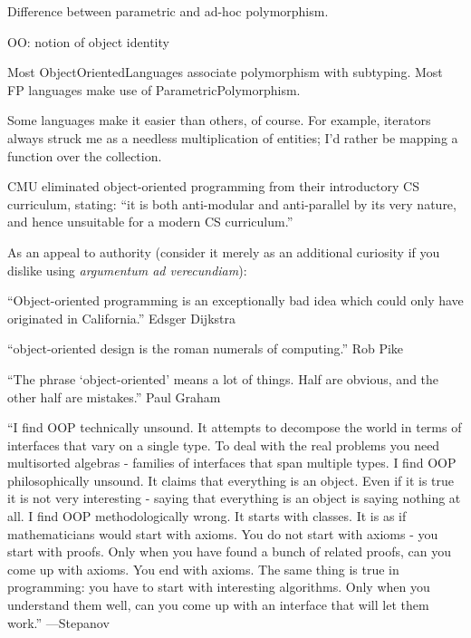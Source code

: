 \documentclass{article}
\begin{document}
Difference between parametric and ad-hoc polymorphism.

OO: notion of object identity

Most ObjectOrientedLanguages associate polymorphism with subtyping. Most FP
languages make use of ParametricPolymorphism.

Some languages make it easier than others, of course. For example, iterators
always struck me as a needless multiplication of entities; I'd rather be
mapping a function over the collection.

\newpage

CMU eliminated object-oriented programming from their introductory CS
curriculum, stating:
\enquote{it is both anti-modular and anti-parallel by its very nature, and hence
unsuitable for a modern CS curriculum.}\cite{HL11}


As an appeal to authority (consider it merely as an additional curiosity if
you dislike using \textit{argumentum ad verecundiam}):

\enquote{Object-oriented programming is an exceptionally bad idea which could only have originated in California.}
Edsger Dijkstra

\enquote{object-oriented design is the roman numerals of computing.}
Rob Pike

\enquote{The phrase \enquote{object-oriented} means a lot of things. Half are obvious, and the other half are mistakes.}
Paul Graham

\enquote{I find OOP technically unsound. It attempts to decompose the world in terms
of interfaces that vary on a single type. To deal with the real problems you
need multisorted algebras - families of interfaces that span multiple types.
I find OOP philosophically unsound. It claims that everything is an object.
Even if it is true it is not very interesting - saying that everything is an
object is saying nothing at all. I find OOP methodologically wrong. It starts
with classes. It is as if mathematicians would start with axioms. You do not
start with axioms - you start with proofs. Only when you have found a bunch
of related proofs, can you come up with axioms. You end with axioms. The same
thing is true in programming: you have to start with interesting algorithms.
Only when you understand them well, can you come up with an interface that
will let them work.}
---Stepanov\cite{Gra}
\end{document}
